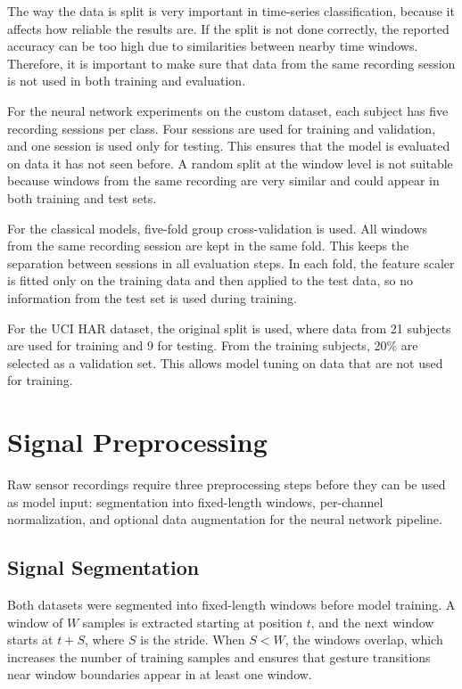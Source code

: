 The way the data is split is very important in time-series classification, because it affects how reliable the results are. If the split is not done correctly, the reported accuracy can be too high due to similarities between nearby time windows. Therefore, it is important to make sure that data from the same recording session is not used in both training and evaluation.

For the neural network experiments on the custom dataset, each subject has five recording sessions per class. Four sessions are used for training and validation, and one session is used only for testing. This ensures that the model is evaluated on data it has not seen before. A random split at the window level is not suitable because windows from the same recording are very similar and could appear in both training and test sets.

For the classical models, five-fold group cross-validation is used. All windows from the same recording session are kept in the same fold. This keeps the separation between sessions in all evaluation steps. In each fold, the feature scaler is fitted only on the training data and then applied to the test data, so no information from the test set is used during training.

For the UCI HAR dataset, the original split is used, where data from 21 subjects are used for training and 9 for testing. From the training subjects, 20\% are selected as a validation set. This allows model tuning on data that are not used for training.

\section{Signal Preprocessing}
\label{sec:preprocessing}

Raw sensor recordings require three preprocessing steps before they can be used as model input: segmentation into fixed-length windows, per-channel normalization, and optional data augmentation for the neural network pipeline.

\subsection{Signal Segmentation}
 
Both datasets were segmented into fixed-length windows before model training. A window of $W$ samples is extracted starting at position $t$, and the next window starts at $t + S$, where $S$ is the stride. When $S < W$, the windows overlap, which increases the number of training samples and ensures that gesture transitions near window boundaries appear in at least one window.
 
